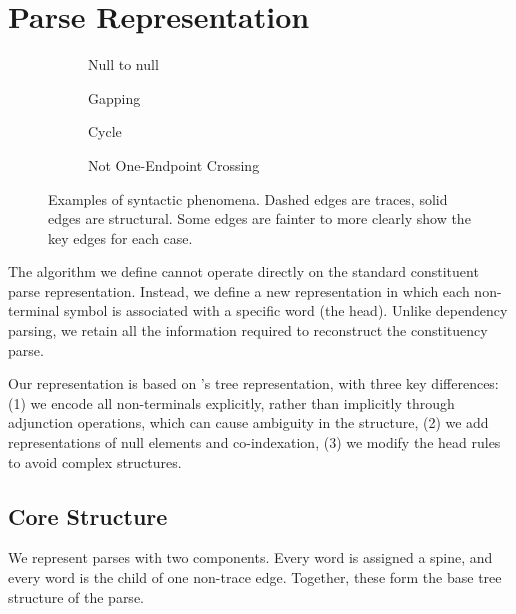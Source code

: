 \section{Parse Representation}

\begin{figure*}
\begin{subfigure}[b][3.75cm][b]{0.19\textwidth}
  \centering
  \scalebox{0.5}{}
  \caption{\label{fig:null-null}
    Null to null
  }
\end{subfigure}
\hspace{4mm}
\begin{subfigure}[b][3.75cm][b]{0.24\textwidth}
  \centering
  \scalebox{0.5}{ }
  \caption{\label{fig:gapping}
    Gapping
  }
\end{subfigure}
\hspace{4mm}
\begin{subfigure}[b][3.75cm][b]{0.16\textwidth}
  \centering
  \scalebox{0.5}{ }
  \caption{\label{fig:cycle}
    Cycle
  }
\end{subfigure}
\hspace{4mm}
\begin{subfigure}[b][3.75cm][b]{0.29\textwidth}
  \centering
  \scalebox{0.5}{ }
  \caption{\label{fig:not-1ec}
    Not One-Endpoint Crossing
  }
\end{subfigure}
\caption{
Examples of syntactic phenomena.
Dashed edges are traces, solid edges are structural.
Some edges are fainter to more clearly show the key edges for each case.
}
\end{figure*}

The algorithm we define cannot operate directly on the standard constituent parse representation.
Instead, we define a new representation in which each non-terminal symbol is associated with a specific word (the head).
Unlike dependency parsing, we retain all the information required to reconstruct the constituency parse.

Our representation is based on \textcite{cck}'s tree representation, with three key differences:
(1) we encode all non-terminals explicitly, rather than implicitly through adjunction operations, which can cause ambiguity in the structure,
(2) we add representations of null elements and co-indexation,
(3) we modify the head rules to avoid complex structures.

\subsection{Core Structure}
We represent parses with two components.
Every word is assigned a spine, and every word is the child of one non-trace edge.
Together, these form the base tree structure of the parse.

